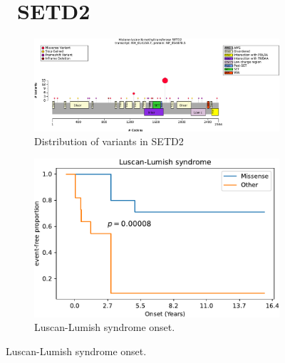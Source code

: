 \begin{figure}[htbp]
\section*{ SETD2}
\centering
\begin{subfigure}[b]{0.65\textwidth}
\centering
\includegraphics[width=\textwidth]{img/SETD2_protein_diagram.pdf} 
\captionsetup{justification=raggedright,singlelinecheck=false}
\caption{Distribution of variants in SETD2}
\end{subfigure}
\begin{subfigure}[b]{0.3\textwidth}
\centering
\includegraphics[width=1\textwidth]{ img/SETD2_stats.pdf} 
\captionsetup{justification=raggedright,singlelinecheck=false}
\caption{Luscan-Lumish syndrome onset. }
\end{subfigure}

\vspace{0.5em}


\end{figure}
